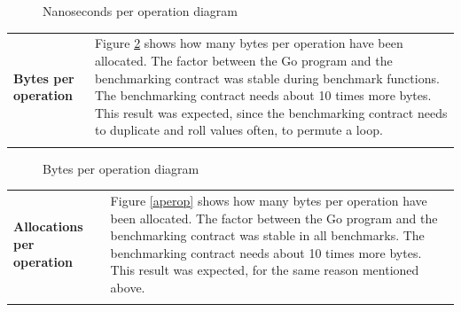 \begin{figure}[H]
	\begin{center}
	\caption{Nanoseconds per operation diagram}
	\label{nperop}
	\end{center}
\end{figure}

\begin{tabular}[t]{ p{3cm} p{12.5cm}}
\raggedright
\textbf{Bytes per operation} &
Figure \ref{bperop} shows how many bytes per operation have been allocated. The factor between the Go program and the benchmarking contract was stable during benchmark functions. The benchmarking contract needs about 10 times more bytes. This result was expected, since the benchmarking contract needs to duplicate and roll values often, to permute a loop. \\ \\
\end{tabular}

\begin{figure}[H]
	\begin{center}
	\caption{Bytes per operation diagram}
	\label{bperop}
	\end{center}
\end{figure}

\begin{tabular}[t]{ p{3cm} p{12.5cm}}
\raggedright
\textbf{Allocations per operation} &
Figure \ref{aperop} shows how many bytes per operation have been allocated. The factor between the Go program and the benchmarking contract was stable in all benchmarks. The benchmarking contract needs about 10 times more bytes. This result was expected, for the same reason mentioned above. \\ \\
\end{tabular}

